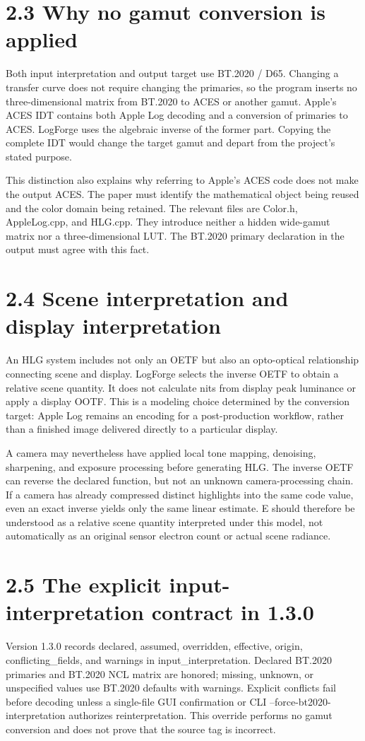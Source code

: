 \documentclass[11pt,a4paper,openany]{book}
\begin{document}
\section*{2.3 Why no gamut conversion is applied}
Both input interpretation and output target use BT.2020 / D65. Changing a transfer curve does not require changing the primaries, so the program inserts no three-dimensional matrix from BT.2020 to ACES or another gamut. Apple's ACES IDT contains both Apple Log decoding and a conversion of primaries to ACES. LogForge uses the algebraic inverse of the former part. Copying the complete IDT would change the target gamut and depart from the project's stated purpose.

This distinction also explains why referring to Apple's ACES code does not make the output ACES. The paper must identify the mathematical object being reused and the color domain being retained. The relevant files are Color.h, AppleLog.cpp, and HLG.cpp. They introduce neither a hidden wide-gamut matrix nor a three-dimensional LUT. The BT.2020 primary declaration in the output must agree with this fact.


\section*{2.4 Scene interpretation and display interpretation}
An HLG system includes not only an OETF but also an opto-optical relationship connecting scene and display. LogForge selects the inverse OETF to obtain a relative scene quantity. It does not calculate nits from display peak luminance or apply a display OOTF. This is a modeling choice determined by the conversion target: Apple Log remains an encoding for a post-production workflow, rather than a finished image delivered directly to a particular display.

A camera may nevertheless have applied local tone mapping, denoising, sharpening, and exposure processing before generating HLG. The inverse OETF can reverse the declared function, but not an unknown camera-processing chain. If a camera has already compressed distinct highlights into the same code value, even an exact inverse yields only the same linear estimate. E should therefore be understood as a relative scene quantity interpreted under this model, not automatically as an original sensor electron count or actual scene radiance.


\section*{2.5 The explicit input-interpretation contract in 1.3.0}
Version 1.3.0 records declared, assumed, overridden, effective, origin, conflicting\_fields, and warnings in input\_interpretation. Declared BT.2020 primaries and BT.2020 NCL matrix are honored; missing, unknown, or unspecified values use BT.2020 defaults with warnings. Explicit conflicts fail before decoding unless a single-file GUI confirmation or CLI --force-bt2020-interpretation authorizes reinterpretation. This override performs no gamut conversion and does not prove that the source tag is incorrect.
\end{document}
